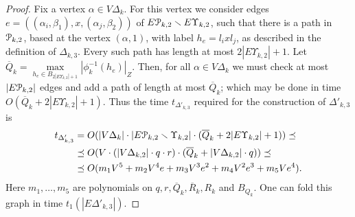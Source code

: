 \documentclass[a4paper,12pt]{article}
\renewcommand{\a}{\alpha }
\renewcommand{\b}{\beta }
\newcommand{\G}{\Gamma }
\newcommand{\D}{\Delta }
\newcommand{\T}{\Theta }
\newcommand{\U}{\Upsilon }
\newcommand{\cP}{{\cal{P}}}
\numberwithin{equation}{section}
\numberwithin{figure}{section}
\begin{document}
\begin{proof}
Fix a vertex $\a \in V\D_k$. For this vertex we consider edges
$e=((\a_i,\b_1), x,(\a_j,\b_2) )$ of $E\cP_{k,2}\smallsetminus E\U_{k,2}$,
such that there
is a path in $\cP_{k,2}$, based at the  vertex $(\a,1)$, with label
$h_e=l_i x l_j$, as described in the definition of $\D_{k,3}$. Every
such path has  length at most  $2 |E \U_{k,2}| +1$. Let
$\overline{Q}_k=\max\limits_{h_e \in B_{2|E \U_{k,2}|
+1}}|\phi^{-1}_k(h_e)|_Z$.
Then, for all $\a \in V\D_k$ we must check at most
$|E\cP_{k,2}|$ edges and add a path of length at most $\overline{Q}_k$;
 which may be done  in time $O(\overline{Q}_k+2 |E\U_{k,2}| +1)$.
Thus the time $t_{\D'_{k,3}}$ required for the construction of $\D'_{k,3}$
is
\begin{equation}\label{theta'3}
\begin{split}
t_{\D'_{k,3}} &= O(|V\D_k|\cdot |E\cP_{k,2}\smallsetminus \U_{k,2}|\cdot (\overline{Q}_k+2 |E \U_{k,2}| +1))\preceq\\
&\preceq     O(V \cdot (|V\D_{k,2}|\cdot q \cdot r) \cdot
(\overline{Q}_k+|V\D_{k,2}|\cdot q))\preceq\\
&\preceq  O(m_1 V^5 + m_2V^4 e +m_3 V^3 e^2 +m_4 V^2 e^3 + m_5 V
e^4).
\end{split}
\end{equation}
Here $m_1, \ldots, m_5$ are polynomials on $q, r, \overline{Q}_k,
\overline{R}_k, R_k$ and $B_{Q_k}$. One can fold this graph in
time $t_1(|E\D'_{k,3}|)$.


\end{proof}
\end{document}
